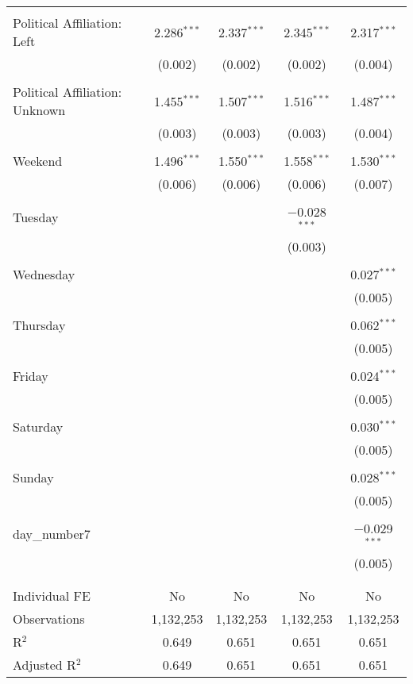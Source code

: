\documentclass[
]{article}
\begin{document}
\begin{table}[!htbp]
{\begin{tabular}{@{\extracolsep{5pt}}lcccc}
  & & & & \\ 
 Political Affiliation: Left & 2.286$^{***}$ & 2.337$^{***}$ & 2.345$^{***}$ & 2.317$^{***}$ \\ 
  & (0.002) & (0.002) & (0.002) & (0.004) \\ 
  & & & & \\ 
 Political Affiliation: Unknown & 1.455$^{***}$ & 1.507$^{***}$ & 1.516$^{***}$ & 1.487$^{***}$ \\ 
  & (0.003) & (0.003) & (0.003) & (0.004) \\ 
  & & & & \\ 
 Weekend & 1.496$^{***}$ & 1.550$^{***}$ & 1.558$^{***}$ & 1.530$^{***}$ \\ 
  & (0.006) & (0.006) & (0.006) & (0.007) \\ 
  & & & & \\ 
 Tuesday &  &  & $-$0.028$^{***}$ &  \\ 
  &  &  & (0.003) &  \\ 
  & & & & \\ 
 Wednesday &  &  &  & 0.027$^{***}$ \\ 
  &  &  &  & (0.005) \\ 
  & & & & \\ 
 Thursday &  &  &  & 0.062$^{***}$ \\ 
  &  &  &  & (0.005) \\ 
  & & & & \\ 
 Friday &  &  &  & 0.024$^{***}$ \\ 
  &  &  &  & (0.005) \\ 
  & & & & \\ 
 Saturday &  &  &  & 0.030$^{***}$ \\ 
  &  &  &  & (0.005) \\ 
  & & & & \\ 
 Sunday &  &  &  & 0.028$^{***}$ \\ 
  &  &  &  & (0.005) \\ 
  & & & & \\ 
 day\_number7 &  &  &  & $-$0.029$^{***}$ \\ 
  &  &  &  & (0.005) \\ 
  & & & & \\ 
\hline \\[-1.8ex] 
Individual FE & No & No & No & No \\ 
Observations & 1,132,253 & 1,132,253 & 1,132,253 & 1,132,253 \\ 
R$^{2}$ & 0.649 & 0.651 & 0.651 & 0.651 \\ 
Adjusted R$^{2}$ & 0.649 & 0.651 & 0.651 & 0.651 \\ 

\end{tabular}}
\end{table}
\end{document}
